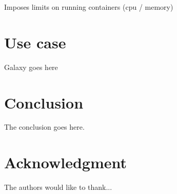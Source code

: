 \documentclass[conference]{IEEEtran}
\begin{document}
Imposes limits on running containers (cpu / memory)

\section{Use case}
Galaxy goes here

\section{Conclusion}
The conclusion goes here.
\section*{Acknowledgment}
The authors would like to thank... 




\end{document}
